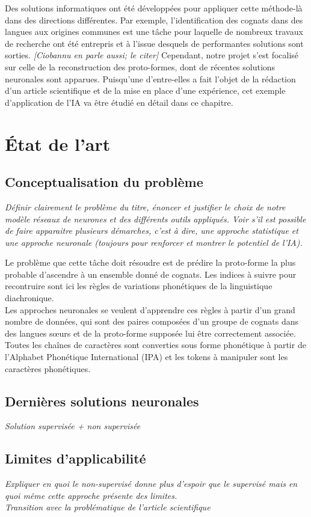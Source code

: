 \documentclass[12pt, french, twoside]{report}
\begin{document}
Des solutions informatiques ont été développées pour appliquer cette méthode-là dans des directions différentes. Par exemple, l'identification des cognats dans des langues aux origines communes est une tâche pour laquelle de nombreux travaux de recherche ont été entrepris et à l'issue desquels de performantes solutions sont sorties.\cite{fourrier} \textit{[Ciobannu en parle aussi; le citer]} Cependant, notre projet s'est focalisé sur celle de la reconstruction des proto-formes, dont de récentes solutions neuronales sont apparues. Puisqu'une d'entre-elles a fait l'objet de la rédaction d'un article scientifique et de la mise en place d'une expérience, cet exemple d'application de l'IA va être étudié en détail dans ce chapitre.
\section{État de l'art}
\subsection{Conceptualisation du problème}
\textit{Définir clairement le problème du titre, énoncer et justifier le choix de notre modèle réseaux de neurones et des différents outils appliqués. Voir s'il est possible de faire apparaitre plusieurs démarches, c'est à dire, une approche statistique et une approche neuronale (toujours pour renforcer et montrer le potentiel de l'IA).}

Le problème que cette tâche doit résoudre est de prédire la proto-forme la plus probable d'ascendre à un ensemble donné de cognats. Les indices à suivre pour recontruire sont ici les règles de variations phonétiques de la linguistique diachronique.\\
Les approches neuronales se veulent d'apprendre ces règles à partir d'un grand nombre de données, qui sont des paires composées d'un groupe de cognats dans des langues s\oe{}urs et de la proto-forme supposée lui être correctement associée. Toutes les chaînes de caractères sont converties sous forme phonétique à partir de l'Alphabet Phonétique International (IPA) et les tokens à manipuler sont les caractères phonétiques.

\subsection{Dernières solutions neuronales}
\textit{Solution supervisée + non supervisée}


\subsection{Limites d'applicabilité}
\textit{Expliquer en quoi le non-supervisé donne plus d'espoir que le supervisé mais en quoi même cette approche présente des limites.}\\
\textit{Transition avec la problématique de l'article scientifique}\\
\end{document}
